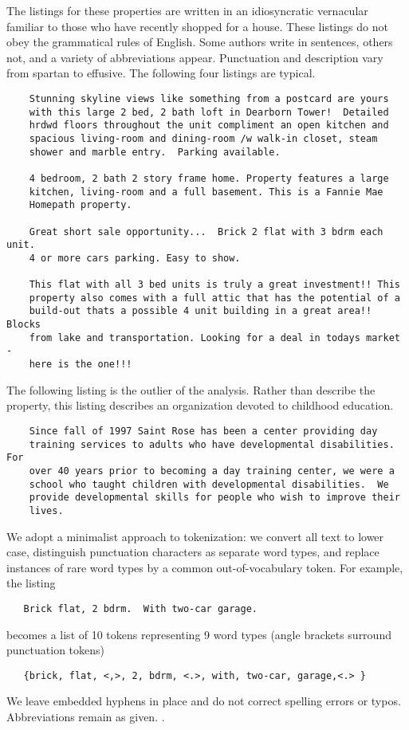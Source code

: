 \documentclass[12pt]{article}\usepackage[]{graphicx}\usepackage[]{color}
\begin{document}
 The listings for these properties are written in an idiosyncratic
 vernacular familiar to those who have recently shopped for a house.
  These listings do not obey the grammatical rules of English.  Some
 authors write in sentences, others not, and a variety of
 abbreviations appear.  Punctuation and description vary from spartan
 to effusive.  The following four listings are typical.

 \begin{verbatim}
    Stunning skyline views like something from a postcard are yours
    with this large 2 bed, 2 bath loft in Dearborn Tower!  Detailed
    hrdwd floors throughout the unit compliment an open kitchen and
    spacious living-room and dining-room /w walk-in closet, steam
    shower and marble entry.  Parking available.

    4 bedroom, 2 bath 2 story frame home. Property features a large
    kitchen, living-room and a full basement. This is a Fannie Mae
    Homepath property.

    Great short sale opportunity...  Brick 2 flat with 3 bdrm each unit.
    4 or more cars parking. Easy to show.

    This flat with all 3 bed units is truly a great investment!! This
    property also comes with a full attic that has the potential of a
    build-out thats a possible 4 unit building in a great area!!  Blocks
    from lake and transportation. Looking for a deal in todays market -
    here is the one!!!
 \end{verbatim}

 \noindent
 The following listing is the outlier of the analysis.  Rather than
 describe the property, this listing describes an organization devoted
 to childhood education.

 \begin{verbatim}
    Since fall of 1997 Saint Rose has been a center providing day
    training services to adults who have developmental disabilities.  For
    over 40 years prior to becoming a day training center, we were a
    school who taught children with developmental disabilities.  We
    provide developmental skills for people who wish to improve their
    lives.
 \end{verbatim}


 We adopt a minimalist approach to tokenization: we convert all text
 to lower case, distinguish punctuation characters as separate word
 types, and replace instances of rare word types by a common
 out-of-vocabulary token.  For example, the listing
 \begin{verbatim}
   Brick flat, 2 bdrm.  With two-car garage.
 \end{verbatim}
 \noindent
 becomes a list of 10 tokens representing 9 word types (angle brackets
 surround punctuation tokens)
 \begin{verbatim}
   {brick, flat, <,>, 2, bdrm, <.>, with, two-car, garage,<.> }
 \end{verbatim}
 \noindent
 We leave embedded hyphens in place and do not correct spelling errors
 or typos.  Abbreviations remain as given. \citep[][describe more
 elaborate methods for tokenizing that are more suited to regular
 language.]{manning99,jurafsky09,turney10}.
\end{document}
